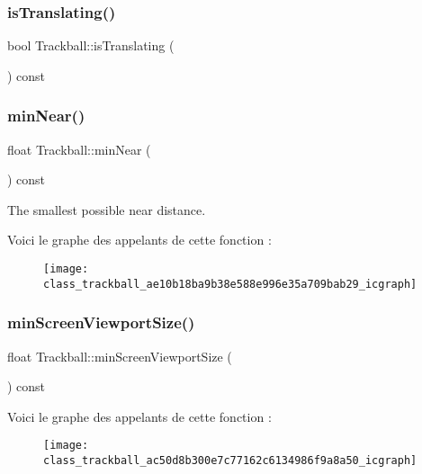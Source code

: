 \subsubsection{\texorpdfstring{is\+Translating()}{isTranslating()}}
{\footnotesize\ttfamily bool Trackball\+::is\+Translating (\begin{DoxyParamCaption}{ }\end{DoxyParamCaption}) const}

\mbox{\label{class_trackball_ae10b18ba9b38e588e996e35a709bab29}} 
\subsubsection{\texorpdfstring{min\+Near()}{minNear()}}
{\footnotesize\ttfamily float Trackball\+::min\+Near (\begin{DoxyParamCaption}{ }\end{DoxyParamCaption}) const}



The smallest possible near distance. 

Voici le graphe des appelants de cette fonction \+:\nopagebreak
\begin{figure}[H]
\begin{center}
\leavevmode
\texttt{[image: class\_trackball\_ae10b18ba9b38e588e996e35a709bab29\_icgraph]}
\end{center}
\end{figure}
\mbox{\label{class_trackball_ac50d8b300e7c77162c6134986f9a8a50}} 
\subsubsection{\texorpdfstring{min\+Screen\+Viewport\+Size()}{minScreenViewportSize()}}
{\footnotesize\ttfamily float Trackball\+::min\+Screen\+Viewport\+Size (\begin{DoxyParamCaption}{ }\end{DoxyParamCaption}) const}

Voici le graphe des appelants de cette fonction \+:\nopagebreak
\begin{figure}[H]
\begin{center}
\leavevmode
\texttt{[image: class\_trackball\_ac50d8b300e7c77162c6134986f9a8a50\_icgraph]}
\end{center}
\end{figure}
\mbox{\label{class_trackball_a1e4f2903b71d3bdd8327294d4e9c58b8}} 
